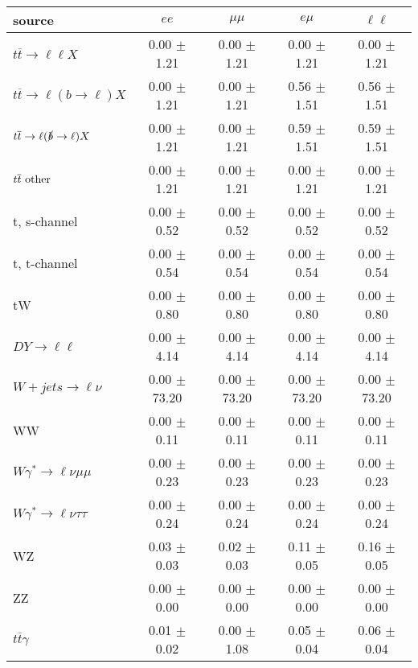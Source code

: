 \begin{tabular}{l|cccc} \hline\hline
source & $ee$ & $\mu\mu$ & $e\mu$ & $\ell\ell $ \\
\hline
$t\overline{t} \rightarrow \ell \ell X$ &  0.00 $\pm$  1.21 &  0.00 $\pm$  1.21 &  0.00 $\pm$  1.21 &  0.00 $\pm$  1.21 \\
$t\overline{t} \rightarrow \ell (b \rightarrow \ell) X$ &  0.00 $\pm$  1.21 &  0.00 $\pm$  1.21 &  0.56 $\pm$  1.51 &  0.56 $\pm$  1.51 \\
$t\overline{t} \rightarrow \ell (\slashed b \rightarrow \ell) X$ &  0.00 $\pm$  1.21 &  0.00 $\pm$  1.21 &  0.59 $\pm$  1.51 &  0.59 $\pm$  1.51 \\
        $t\overline{t}\ \rm{other}$ &  0.00 $\pm$  1.21 &  0.00 $\pm$  1.21 &  0.00 $\pm$  1.21 &  0.00 $\pm$  1.21 \\
\hline
                       t, s-channel &  0.00 $\pm$  0.52 &  0.00 $\pm$  0.52 &  0.00 $\pm$  0.52 &  0.00 $\pm$  0.52 \\
                       t, t-channel &  0.00 $\pm$  0.54 &  0.00 $\pm$  0.54 &  0.00 $\pm$  0.54 &  0.00 $\pm$  0.54 \\
                                 tW &  0.00 $\pm$  0.80 &  0.00 $\pm$  0.80 &  0.00 $\pm$  0.80 &  0.00 $\pm$  0.80 \\
\hline
         $DY \rightarrow \ell \ell$ &  0.00 $\pm$  4.14 &  0.00 $\pm$  4.14 &  0.00 $\pm$  4.14 &  0.00 $\pm$  4.14 \\
      $W+jets \rightarrow \ell \nu$ &  0.00 $\pm$ 73.20 &  0.00 $\pm$ 73.20 &  0.00 $\pm$ 73.20 &  0.00 $\pm$ 73.20 \\
                                 WW &  0.00 $\pm$  0.11 &  0.00 $\pm$  0.11 &  0.00 $\pm$  0.11 &  0.00 $\pm$  0.11 \\
\hline
$W\gamma^{*} \rightarrow \ell \nu \mu\mu$ &  0.00 $\pm$  0.23 &  0.00 $\pm$  0.23 &  0.00 $\pm$  0.23 &  0.00 $\pm$  0.23 \\
$W\gamma^{*} \rightarrow \ell \nu \tau\tau$ &  0.00 $\pm$  0.24 &  0.00 $\pm$  0.24 &  0.00 $\pm$  0.24 &  0.00 $\pm$  0.24 \\
                                 WZ &  0.03 $\pm$  0.03 &  0.02 $\pm$  0.03 &  0.11 $\pm$  0.05 &  0.16 $\pm$  0.05 \\
                                 ZZ &  0.00 $\pm$  0.00 &  0.00 $\pm$  0.00 &  0.00 $\pm$  0.00 &  0.00 $\pm$  0.00 \\
\hline
              $t\overline{t}\gamma$ &  0.01 $\pm$  0.02 &  0.00 $\pm$  1.08 &  0.05 $\pm$  0.04 &  0.06 $\pm$  0.04 \\

\end{tabular}

